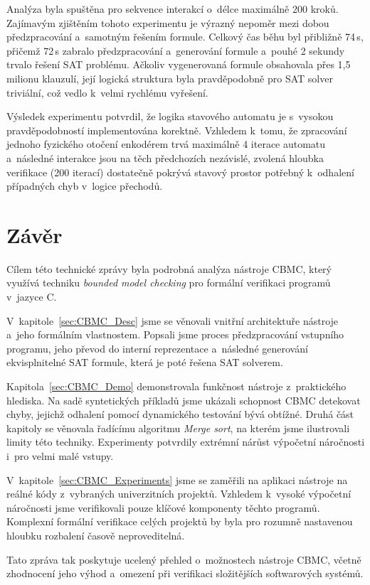 \documentclass[a4paper, 11pt]{article}
\begin{document}
Analýza byla spuštěna pro sekvence interakcí o~délce maximálně 200 kroků.
Zajímavým zjištěním tohoto experimentu je výrazný nepoměr mezi dobou předzpracování a~samotným řešením formule.
Celkový čas běhu byl přibližně 74\,s, přičemž 72\,s zabralo předzpracování a~generování formule a~pouhé 2 sekundy trvalo řešení SAT problému.
Ačkoliv vygenerovaná formule obsahovala přes 1,5 milionu klauzulí, její logická struktura byla pravděpodobně pro SAT solver triviální, což vedlo k~velmi rychlému vyřešení.

Výsledek experimentu potvrdil, že logika stavového automatu je s~vysokou pravděpodobností implementována korektně.
Vzhledem k~tomu, že zpracování jednoho fyzického otočení enkodérem trvá maximálně 4 iterace automatu a~následné interakce jsou na těch předchozích nezávislé, zvolená hloubka verifikace (200 iterací) dostatečně pokrývá stavový prostor potřebný k~odhalení případných chyb v~logice přechodů.

\section{Závěr}

Cílem této technické zprávy byla podrobná analýza nástroje CBMC, který využívá techniku \emph{bounded model checking} pro formální verifikaci programů v~jazyce C.

V~kapitole~\ref{sec:CBMC_Desc} jsme se věnovali vnitřní architektuře nástroje a~jeho formálním vlastnostem.
Popsali jsme proces předzpracování vstupního programu, jeho převod do interní reprezentace a~následné generování ekvisplnitelné SAT formule, která je poté řešena SAT solverem.

Kapitola~\ref{sec:CBMC_Demo} demonstrovala funkčnost nástroje z~praktického hlediska.
Na sadě syntetických příkladů jsme ukázali schopnost CBMC detekovat chyby, jejichž odhalení pomocí dynamického testování bývá obtížné.
Druhá část kapitoly se věnovala řadícímu algoritmu \emph{Merge sort}, na kterém jsme ilustrovali limity této techniky.
Experimenty potvrdily extrémní nárůst výpočetní náročnosti i~pro velmi malé vstupy.

V~kapitole~\ref{sec:CBMC_Experiments} jsme se zaměřili na aplikaci nástroje na reálné kódy z~vybraných univerzitních projektů.
Vzhledem k~vysoké výpočetní náročnosti jsme verifikovali pouze klíčové komponenty těchto programů.
Komplexní formální verifikace celých projektů by byla pro rozumně nastavenou hloubku rozbalení časově neproveditelná.

Tato zpráva tak poskytuje ucelený přehled o~možnostech nástroje CBMC, včetně zhodnocení jeho výhod a~omezení při verifikaci složitějších softwarových systémů.
\end{document}
